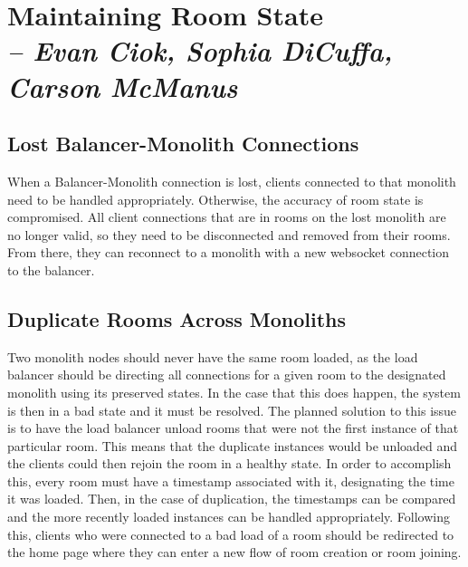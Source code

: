\chapter{Maintaining Room State \\
  \small{\textit{-- Evan Ciok, Sophia DiCuffa, Carson McManus}}
  \label{Chapter::RoomState}}

\section{Lost Balancer-Monolith Connections}

When a Balancer-Monolith connection is lost, clients connected to that monolith need to be handled appropriately. Otherwise, the accuracy of room state is compromised.
All client connections that are in rooms on the lost monolith are no longer valid, so they need to be disconnected and removed
from their rooms. From there, they can reconnect to a monolith with a new websocket connection to the balancer.

\section{Duplicate Rooms Across Monoliths\label{Section::duplicate-rooms-across-monoliths}}

Two monolith nodes should never have the same room loaded, as the load balancer should be directing all connections for a given room to the designated monolith using its preserved states.
In the case that this does happen, the system is then in a bad state and it must be resolved. The planned solution to this issue is to have the load balancer unload rooms that were not the
first instance of that particular room. This means that the duplicate instances would be unloaded and the clients could then rejoin the room in a healthy state. In order to accomplish this,
every room must have a timestamp associated with it, designating the time it was loaded. Then, in the case of duplication, the timestamps can be compared and the more recently loaded
instances can be handled appropriately. Following this, clients who were connected to a bad load of a room should be redirected to the home page where they can enter a new flow of room
creation or room joining.

